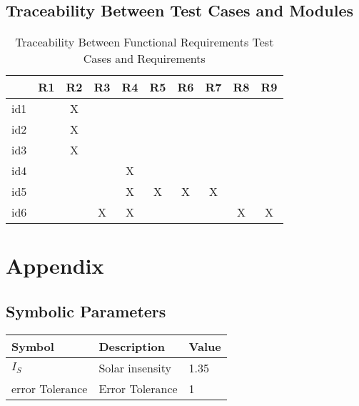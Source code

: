 \documentclass[12pt, titlepage]{article}
\begin{document}
\subsection{Traceability Between Test Cases and Modules}


\begin{table}[h!]
\centering
\begin{tabular}{|c|c|c|c|c|c|c|c|c|c|}
\hline        
	& R1& R2 & R3 &R4 & R5 &R6  &R7 &R8 &R9 \\
\hline
id1     &   & X &     &    &    &    &   &    &     
\\ \hline
id2     &   & X &     &    &    &    &   &    &     \\ 
\hline
id3     &   & X &     &    &    &    &   &    &   
\\ \hline
id4     &   &    &     & X &    &    &   &    &      \\ \hline
id5     &   &    &     & X & X & X & X &    &     \\  \hline
id6     &   &     & X & X &    &    &   & X & X  \\ 
\hline
\end{tabular}
\caption{Traceability Between Functional Requirements Test Cases and
Requirements}
\label{Table:Rtrace}
\end{table}


 
%

\newpage

\section{Appendix}


\subsection{Symbolic Parameters}

  \noindent \begin{tabular}{l l l} 
    \toprule		
    \textbf{Symbol} & \textbf{Description} & \textbf{Value}\\
    \midrule 
    $I_{S}$ & Solar insensity &1.35  \\
error Tolerance & Error Tolerance & 1\\
    \bottomrule
  \end{tabular}
\end{document}
